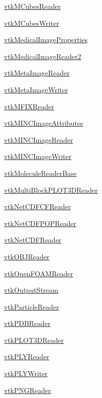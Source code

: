 \begin{DoxyItemize}
\item \hyperlink{vtkio_vtkmcubesreader}{vtk\-M\-Cubes\-Reader}  
\item \hyperlink{vtkio_vtkmcubeswriter}{vtk\-M\-Cubes\-Writer}  
\item \hyperlink{vtkio_vtkmedicalimageproperties}{vtk\-Medical\-Image\-Properties}  
\item \hyperlink{vtkio_vtkmedicalimagereader2}{vtk\-Medical\-Image\-Reader2}  
\item \hyperlink{vtkio_vtkmetaimagereader}{vtk\-Meta\-Image\-Reader}  
\item \hyperlink{vtkio_vtkmetaimagewriter}{vtk\-Meta\-Image\-Writer}  
\item \hyperlink{vtkio_vtkmfixreader}{vtk\-M\-F\-I\-X\-Reader}  
\item \hyperlink{vtkio_vtkmincimageattributes}{vtk\-M\-I\-N\-C\-Image\-Attributes}  
\item \hyperlink{vtkio_vtkmincimagereader}{vtk\-M\-I\-N\-C\-Image\-Reader}  
\item \hyperlink{vtkio_vtkmincimagewriter}{vtk\-M\-I\-N\-C\-Image\-Writer}  
\item \hyperlink{vtkio_vtkmoleculereaderbase}{vtk\-Molecule\-Reader\-Base}  
\item \hyperlink{vtkio_vtkmultiblockplot3dreader}{vtk\-Multi\-Block\-P\-L\-O\-T3\-D\-Reader}  
\item \hyperlink{vtkio_vtknetcdfcfreader}{vtk\-Net\-C\-D\-F\-C\-F\-Reader}  
\item \hyperlink{vtkio_vtknetcdfpopreader}{vtk\-Net\-C\-D\-F\-P\-O\-P\-Reader}  
\item \hyperlink{vtkio_vtknetcdfreader}{vtk\-Net\-C\-D\-F\-Reader}  
\item \hyperlink{vtkio_vtkobjreader}{vtk\-O\-B\-J\-Reader}  
\item \hyperlink{vtkio_vtkopenfoamreader}{vtk\-Open\-F\-O\-A\-M\-Reader}  
\item \hyperlink{vtkio_vtkoutputstream}{vtk\-Output\-Stream}  
\item \hyperlink{vtkio_vtkparticlereader}{vtk\-Particle\-Reader}  
\item \hyperlink{vtkio_vtkpdbreader}{vtk\-P\-D\-B\-Reader}  
\item \hyperlink{vtkio_vtkplot3dreader}{vtk\-P\-L\-O\-T3\-D\-Reader}  
\item \hyperlink{vtkio_vtkplyreader}{vtk\-P\-L\-Y\-Reader}  
\item \hyperlink{vtkio_vtkplywriter}{vtk\-P\-L\-Y\-Writer}  
\item \hyperlink{vtkio_vtkpngreader}{vtk\-P\-N\-G\-Reader}  

\end{DoxyItemize}
